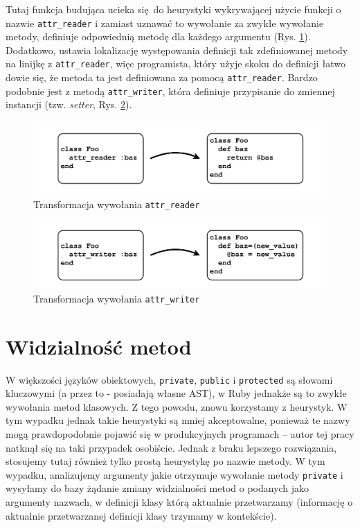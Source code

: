 \documentclass[declaration,shortabstract,mgr]{iithesis}
\begin{document}
Tutaj funkcja budująca ucieka się do heurystyki wykrywającej użycie funkcji o nazwie \texttt{attr\_reader} i zamiast uznawać to wywołanie za zwykłe wywołanie metody, definiuje odpowiednią metodę dla każdego argumentu (Rys. \ref{fig:attr-reader}). Dodatkowo, ustawia lokalizację występowania definicji tak zdefiniowanej metody na linijkę z \texttt{attr\_reader}, więc programista, który użyje skoku do definicji łatwo dowie się, że metoda ta jest definiowana za pomocą \texttt{attr\_reader}. Bardzo podobnie jest z metodą \texttt{attr\_writer}, która definiuje przypisanie do zmiennej instancji (tzw. \textit{setter}, Rys. \ref{fig:attr-writer}).

\begin{figure}[htb]
	\centering
	\includegraphics[scale=0.6]{imgs/attr-reader.png}
	\caption{Transformacja wywołania \texttt{attr\_reader}}
	\label{fig:attr-reader}
\end{figure}

\begin{figure}[htb]
	\centering
	\includegraphics[scale=0.6]{imgs/attr-writer.png}
	\caption{Transformacja wywołania \texttt{attr\_writer}}
	\label{fig:attr-writer}
\end{figure}

\section{Widzialność metod}

W większości języków obiektowych, \texttt{private}, \texttt{public} i \texttt{protected} są słowami kluczowymi (a przez to - posiadają własne AST), w Ruby jednakże są to zwykłe wywołania metod klasowych. Z tego powodu, znowu korzystamy z heurystyk. W tym wypadku jednak takie heurystyki są mniej akceptowalne, ponieważ te nazwy mogą prawdopodobnie pojawić się w produkcyjnych programach -- autor tej pracy natknął się na taki przypadek osobiście. Jednak z braku lepszego rozwiązania, stosujemy tutaj również tylko prostą heurystykę po nazwie metody. W tym wypadku, analizujemy argumenty jakie otrzymuje wywołanie metody \texttt{private} i wysyłamy do bazy żądanie zmiany widzialności metod o podanych jako argumenty nazwach, w definicji klasy którą aktualnie przetwarzamy (informację o aktualnie przetwarzanej definicji klasy trzymamy w kontekście).
\end{document}
